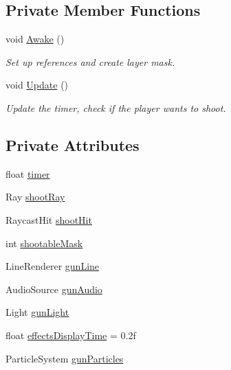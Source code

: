 \subsection*{Private Member Functions}
\begin{DoxyCompactItemize}
\item 
void \mbox{\hyperlink{class_player_shooting_aea34d54bb699a98bfcc0d13aa2f2df0a}{Awake}} ()
\begin{DoxyCompactList}\small\item\em Set up references and create layer mask. \end{DoxyCompactList}\item 
void \mbox{\hyperlink{class_player_shooting_af307c98a01b176497628a3ddfab7afb8}{Update}} ()
\begin{DoxyCompactList}\small\item\em Update the timer, check if the player wants to shoot. \end{DoxyCompactList}\end{DoxyCompactItemize}
\subsection*{Private Attributes}
\begin{DoxyCompactItemize}
\item 
float \mbox{\hyperlink{class_player_shooting_a5ad5135f9bd4b04ae8cad70e0533d468}{timer}}
\item 
Ray \mbox{\hyperlink{class_player_shooting_a6365fc62a70d708142b034757cc37846}{shoot\+Ray}}
\item 
Raycast\+Hit \mbox{\hyperlink{class_player_shooting_a43518b2a507f47b8bc8dede4b9b19081}{shoot\+Hit}}
\item 
int \mbox{\hyperlink{class_player_shooting_aacbf8081c0909becb5543561fbc8445b}{shootable\+Mask}}
\item 
Line\+Renderer \mbox{\hyperlink{class_player_shooting_aedfb98ce8d7e10af54f2c2be2079dec9}{gun\+Line}}
\item 
Audio\+Source \mbox{\hyperlink{class_player_shooting_ab07dd38fd68161912490b5d2ddfa4e43}{gun\+Audio}}
\item 
Light \mbox{\hyperlink{class_player_shooting_afa5a1e6c7e3a7e8857a0440969ea625c}{gun\+Light}}
\item 
float \mbox{\hyperlink{class_player_shooting_aaaa1158df1f607715fb2ec41dc482c20}{effects\+Display\+Time}} = 0.\+2f
\item 
Particle\+System \mbox{\hyperlink{class_player_shooting_ab65f21d2aeda8a6f47865654898c649a}{gun\+Particles}}
\end{DoxyCompactItemize}


